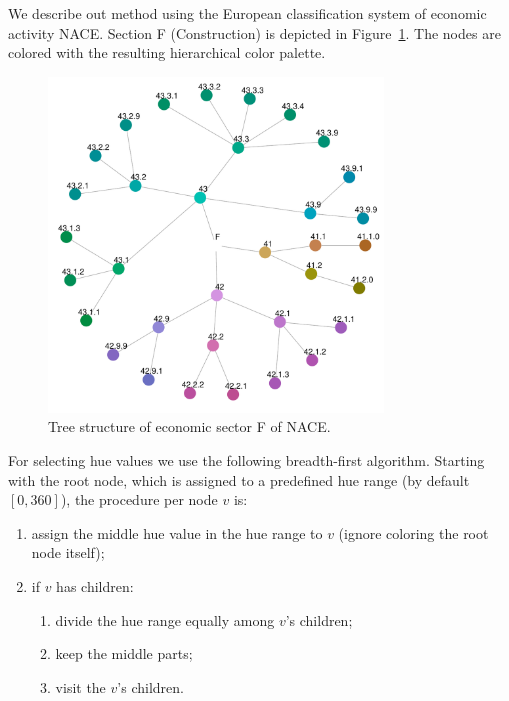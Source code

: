 \documentclass[review]{vgtc}                 %
\begin{document}
We describe out method using the European classification system of economic activity NACE. Section F (Construction) is depicted in Figure~\ref{fig:sbiF}. The nodes are colored with the   resulting hierarchical color palette. 


\begin{figure}[htb]
  \centering
  \includegraphics[width=3.5in]{sbi_F.pdf}
  \caption{Tree structure of economic sector F of NACE.}\label{fig:sbiF}
\end{figure}

For selecting hue values we use the following breadth-first algorithm. Starting with the root node, which is assigned to a predefined hue range (by default $[0, 360]$), the procedure per node $v$ is: 
\begin{enumerate} \itemsep1pt \parskip0pt 
\item assign the middle hue value in the hue range to $v$ (ignore coloring the root node itself);
\item if $v$ has children:
\begin{enumerate} \itemsep1pt \parskip0pt 
\item divide the hue range equally among $v$'s children;
\item keep the middle parts;
\item visit the $v$'s children.
\end{enumerate}
\end{enumerate}
\end{document}
